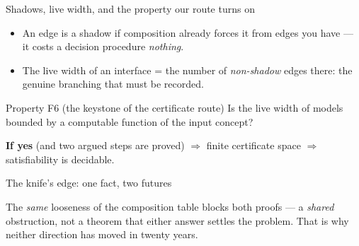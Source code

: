 \documentclass[aspectratio=169,11pt]{beamer}
\begin{document}
\begin{frame}{Shadows, live width, and the property our route turns on}
\begin{itemize}
  \item An edge is a \alert{shadow} if composition already forces it from
        edges you have --- it costs a decision procedure \emph{nothing}.
  \item The \alert{live width} of an interface = the number of
        \emph{non-shadow} edges there: the genuine branching that must be recorded.
\end{itemize}
\vfill
\begin{block}{Property F6 (the keystone of the certificate route)}
  Is the live width of models bounded by a computable function of the
  input concept?
\end{block}
\vfill
\begin{center}
  \textbf{If yes} (and two argued steps are proved) $\Rightarrow$ finite
  certificate space $\Rightarrow$ \alert{satisfiability is decidable}.
\end{center}
\end{frame}

\begin{frame}{The knife's edge: one fact, two futures}
\begin{center}
\end{center}
\vfill
The \emph{same} looseness of the composition table blocks \alert{both}
proofs --- a \emph{shared} obstruction, not a theorem that either answer
settles the problem. That is why neither direction has moved in twenty years.
\end{frame}
\end{document}
